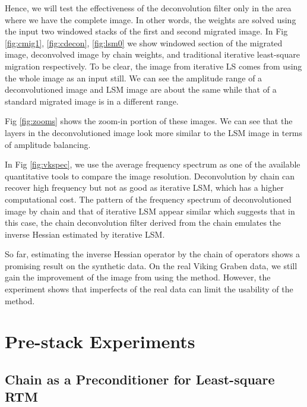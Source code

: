%
Hence, we will test the effectiveness of the deconvolution filter only in the area where we have the complete image. In other words, the weights are solved using the input two windowed stacks of the first and second migrated image. In Fig \ref{fig:cmig1}, \ref{fig:cdecon}, \ref{fig:lsm0} we show windowed section of the migrated image, deconvolved image by chain weights, and traditional iterative least-square migration respectively. To be clear, the image from iterative LS comes from using the whole image as an input still. We can see the amplitude range of a deconvolutioned image and LSM image are about the same while that of a standard migrated image is in a different range.  



Fig \ref{fig:zooms} shows the zoom-in portion of these images. We can see that the layers in the deconvolutioned image look more similar to the LSM image in terms of amplitude balancing.


In Fig \ref{fig:vkspec}, we use the average frequency spectrum as one of the available quantitative tools to compare the image resolution. Deconvolution by chain can recover high frequency but not as good as iterative LSM, which has a higher computational cost. The pattern of the frequency spectrum of deconvolutioned image by chain and that of iterative LSM appear similar which suggests that in this case, the chain deconvolution filter derived from the chain emulates the inverse Hessian estimated by iterative LSM.


So far, estimating the inverse Hessian operator by the chain of operators shows a promising result on the synthetic data. On the real Viking Graben data, we still gain the improvement of the image from using the method. However, the experiment shows that imperfects of the real data can limit the usability of the method.


%
%
\newpage
\section{Pre-stack Experiments}
\subsection{Chain as a Preconditioner for Least-square RTM}

